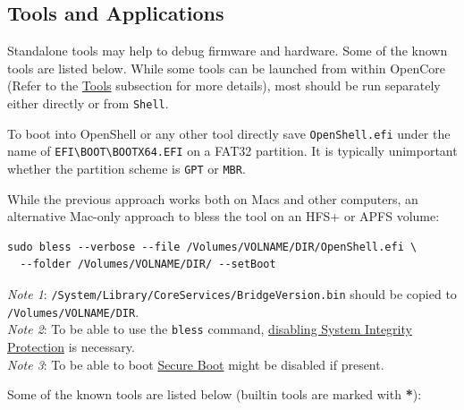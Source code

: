 \documentclass[]{article}
\begin{document}
\subsection{Tools and Applications}\label{uefitools}

Standalone tools may help to debug firmware and hardware. Some of the known tools are listed below.
While some tools can be launched from within OpenCore (Refer to the \hyperref[misctools]{Tools} subsection
for more details), most should be run separately either directly or from \texttt{Shell}.

To boot into OpenShell or any other tool directly save \texttt{OpenShell.efi}
under the name of \texttt{EFI\textbackslash BOOT\textbackslash BOOTX64.EFI}
on a FAT32 partition. It is typically unimportant whether the partition scheme
is \texttt{GPT} or \texttt{MBR}.

While the previous approach works both on Macs and other computers,
an alternative Mac-only approach to bless the tool on an HFS+ or APFS
volume:

\begin{lstlisting}[caption=Blessing tool, label=blesstool, style=ocbash]
sudo bless --verbose --file /Volumes/VOLNAME/DIR/OpenShell.efi \
  --folder /Volumes/VOLNAME/DIR/ --setBoot
\end{lstlisting}

\emph{Note 1}: \texttt{/System/Library/CoreServices/BridgeVersion.bin} should be copied
  to \texttt{/Volumes/VOLNAME/DIR}. \\
\emph{Note 2}: To be able to use the \texttt{bless} command,
  \href{https://developer.apple.com/library/archive/documentation/Security/Conceptual/System_Integrity_Protection_Guide/ConfiguringSystemIntegrityProtection/ConfiguringSystemIntegrityProtection.html}{disabling System Integrity Protection} is necessary. \\
\emph{Note 3}: To be able to boot \href{https://support.apple.com/HT208330}{Secure Boot}
  might be disabled if present.

Some of the known tools are listed below (builtin tools are marked with \textbf{*}):
\end{document}
